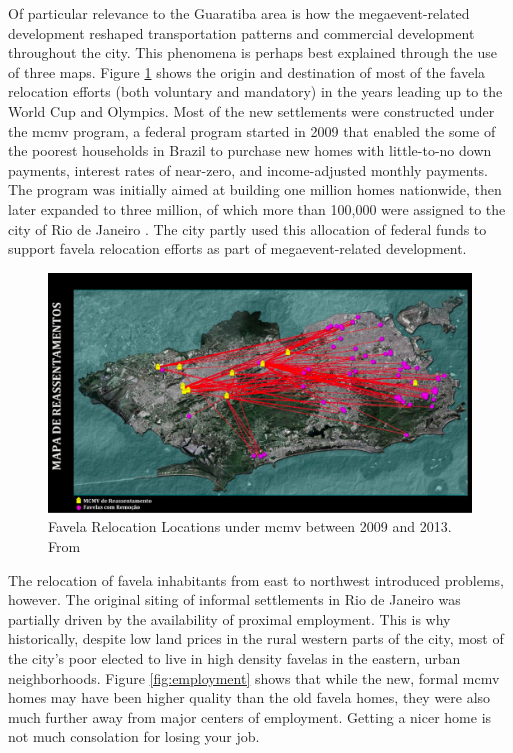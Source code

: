Of particular relevance to the Guaratiba area is how the megaevent-related development reshaped transportation patterns and commercial development throughout the city. This phenomena is perhaps best explained through the use of three maps. Figure \ref{fig:relocation} shows the origin and destination of most of the favela relocation efforts (both voluntary and mandatory) in the years leading up to the World Cup and Olympics. Most of the new settlements were constructed under the \ac{mcmv} program, a federal program started in 2009 that enabled the some of the poorest households in Brazil to purchase new homes with little-to-no down payments, interest rates of near-zero, and income-adjusted monthly payments. The program was initially aimed at building one million homes nationwide, then later expanded to three million, of which more than 100,000 were assigned to the city of Rio de Janeiro \cite{nadalMinhaCasaMinha2018}. The city partly used this allocation of federal funds to support favela relocation efforts as part of megaevent-related development.

\begin{figure}[!htb]
	\centering
	\includegraphics[scale=0.3]{Figures/chap4/Relocation.png}
	\caption[Favela Relocation Locations under MCMV between 2009 and 2013]{Favela Relocation Locations under \ac{mcmv} between 2009 and 2013. From \cite{faulhaberRioMaravilhaProjetos2012}}
	\label{fig:relocation}
\end{figure}

The relocation of favela inhabitants from east to northwest introduced problems, however. The original siting of informal settlements in Rio de Janeiro was partially driven by the availability of proximal employment. This is why historically, despite low land prices in the rural western parts of the city, most of the city's poor elected to live in high density favelas in the eastern, urban neighborhoods. Figure \ref{fig:employment} shows that while the new, formal \ac{mcmv} homes may have been higher quality than the old favela homes, they were also much further away from major centers of employment. Getting a nicer home is not much consolation for losing your job. 

